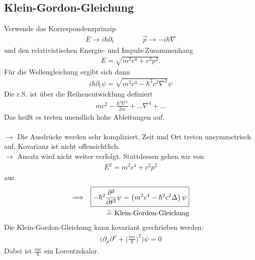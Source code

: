 \subsection{Klein-Gordon-Gleichung}
Verwende das Korrespondenzprinzip
\begin{eqnarray*} E \rightarrow i \hbar \partial _ t \qquad \qquad \vec p \rightarrow - i \hbar \nabla\end{eqnarray*}
und den relativistischen Energie-  und Impuls-Zusammenhang
\begin{eqnarray*} E = \sqrt { m^2 c^4 + c^2 p ^2} . \end{eqnarray*}
Für die Wellengleichung ergibt sich dann
\begin{eqnarray*} i \hbar \partial _ t \psi = \sqrt{ m^2c^4 - \hbar ^2c^2 \nabla^2} \psi \end{eqnarray*}
Die r.S. ist über die Reihenentwicklung definiert
\begin{eqnarray*} m c^2- \frac{\hbar ^2\nabla^2}{2 m} + \dots \nabla^4 + \dots \end{eqnarray*}
Das heißt es treten unendlich hohe Ableitungen auf.\\
\\
$\longrightarrow$ Die Ausdrücke werden sehr kompliziert. Zeit und Ort treten unsymmetrisch auf, Kovarianz ist nicht offensichtlich.\\
$\longrightarrow$ Ansatz wird nicht weiter verfolgt. Stattdessen gehen wir von
\begin{eqnarray*} E^2 = m^2c^4 + c^2p^2\end{eqnarray*} aus.
\begin{eqnarray*} \Longrightarrow &{}&\boxed{ - \hbar^2 \frac {\partial ^2}{\partial t^2} \psi = \left ( m^2c^4 - \hbar ^2c^2\Delta \right )\psi} \\ &{}& \quad \widehat = \text{ Klein-Gordon-Gleichung}\end{eqnarray*}
Die Klein-Gordon-Gleichung kann kovariant geschrieben werden:
\begin{eqnarray*} 
	\Big ( \partial_{\mu}\partial^{\mu} + \big( \frac{m c}{\hbar }\big)^2\Big) \psi = 0
\end{eqnarray*}
Dabei ist $\frac{mc}{\hbar}$ ein Lorentzskalar. 


